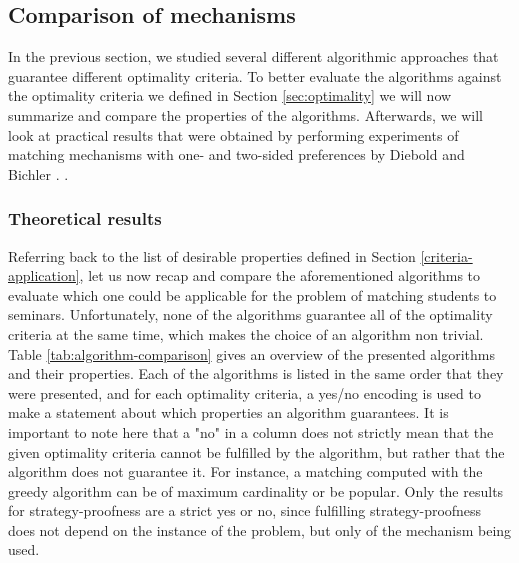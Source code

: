 \subsection{Comparison of mechanisms}
In the previous section, we studied several different algorithmic approaches that guarantee different optimality criteria. To better evaluate the algorithms against the optimality criteria we defined in Section \ref{sec:optimality} we will now summarize and compare the properties of the algorithms. Afterwards, we will look at practical results that were obtained by performing experiments of matching mechanisms with one- and two-sided preferences by Diebold and Bichler \cite{DieboldBenchmark}. .

\subsubsection{Theoretical results}
Referring back to the list of desirable properties defined in Section \ref{criteria-application}, let us now recap and compare the aforementioned algorithms to evaluate which one could be applicable for the problem of matching students to seminars. Unfortunately, none of the algorithms guarantee all of the optimality criteria at the same time, which makes the choice of an algorithm non trivial. Table \ref{tab:algorithm-comparison} gives an overview of the presented algorithms and their properties. Each of the algorithms is listed in the same order that they were presented, and for each optimality criteria, a yes/no encoding is used to make a statement about which properties an algorithm guarantees. It is important to note here that a "no" in a column does not strictly mean that the given optimality criteria cannot be fulfilled by the algorithm, but rather that the algorithm does not guarantee it. For instance, a matching computed with the greedy algorithm can be of maximum cardinality or be popular. Only the results for strategy-proofness are a strict yes or no, since fulfilling strategy-proofness does not depend on the instance of the problem, but only of the mechanism being used. 

